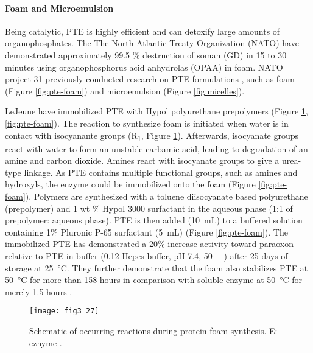 \begin{refsection}
\paragraph{Foam and Microemulsion}
Being catalytic, PTE is highly efficient and can detoxify large amounts of
organophosphates. The The North Atlantic Treaty Organization (NATO) have
demonstrated approximately 99.5 \% destruction of soman (GD) in 15 to 30
minutes \cite{Defrank} using organophosphorus acid anhydrolas (OPAA) in foam.
NATO project 31 previously conducted research on PTE formulations
\cite{Defrank}, such as foam \cite{Lejeune1996,LeJeune1997a,Cheng1996} (Figure
\ref{fig:pte-foam}) and microemulsion \cite{Komives1994} (Figure
\ref{fig:micelles}).

LeJeune  have immobilized PTE with Hypol polyurethane prepolymers
\cite{LeJeune1997a,Lejeune1996} (Figure \ref{fig:foam}, \ref{fig:pte-foam}).
The reaction to synthesize foam is initiated when water is in contact with
isocyanante groups \cite{Lejeune1996} (R\textsubscript{1}, Figure
\ref{fig:foam}). Afterwards, isocyanate groups react with water to form an
unstable carbamic acid, leading to degradation of an amine and carbon dioxide.
Amines react with isocyanate groups to give a urea-type linkage. As PTE
contains multiple functional groups, such as amines and hydroxyls, the enzyme
could be immobilized onto the foam \cite{Lejeune1996} (Figure
\ref{fig:pte-foam}). Polymers are synthesized with a toluene diisocyanate
based polyurethane (prepolymer) and 1 wt \% Hypol 3000 surfactant in the
aqueous phase (1:1 of prepolymer: aqueous phase). PTE is then added
(\SI{10}{\mL}) to a buffered solution containing 1\% Pluronic P-65 surfactant
(\SI{5}{\mL}) \cite{Lejeune1996,LeJeune1997a} (Figure \ref{fig:pte-foam}). The
immobilized PTE has demonstrated a 20\% increase activity toward paraoxon
relative to PTE in buffer (\SI{0.12}{\Molar} Hepes buffer, pH 7.4,
\SI{50}{\micro\Molar} ) after 25 days of storage at
\SI{25}{\celsius}.  They further demonstrate that the foam also stabilizes PTE
at \SI{50}{\celsius} for more than 158 hours in comparison with soluble enzyme
at \SI{50}{\celsius} for merely 1.5 hours \cite{LeJeune1997a}. 
\begin{figure}[htbp] \centering \texttt{[image: fig3\_27]}
    \caption[Schematic of occurring reactions during protein-foam synthesis. E:
    eznyme.]{Schematic of occurring reactions during protein-foam synthesis. E:
        eznyme \cite{Lejeune1996}.}
    \label{fig:foam}
\end{figure}

\end{refsection}
